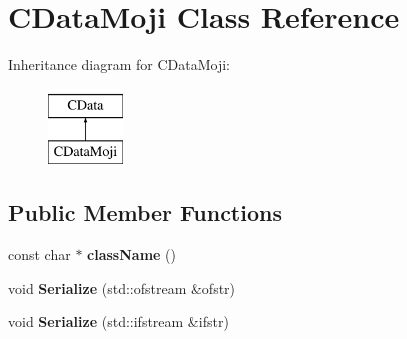 \hypertarget{classCDataMoji}{\section{C\-Data\-Moji Class Reference}
\label{classCDataMoji}
}
Inheritance diagram for C\-Data\-Moji\-:\begin{figure}[H]
\begin{center}
\leavevmode
\includegraphics[height=2.000000cm]{classCDataMoji}
\end{center}
\end{figure}
\subsection*{Public Member Functions}
\begin{DoxyCompactItemize}
\item 
\hypertarget{classCDataMoji_a47bf8c70b639454b5a8c892dc93700fe}{const char $\ast$ {\bfseries class\-Name} ()}\label{classCDataMoji_a47bf8c70b639454b5a8c892dc93700fe}

\item 
\hypertarget{classCDataMoji_a8ac19c7c8cc27f58923eb988aa4c6372}{void {\bfseries Serialize} (std\-::ofstream \&ofstr)}\label{classCDataMoji_a8ac19c7c8cc27f58923eb988aa4c6372}

\item 
\hypertarget{classCDataMoji_a8ca817fab62af63b700748815671bb3b}{void {\bfseries Serialize} (std\-::ifstream \&ifstr)}\label{classCDataMoji_a8ca817fab62af63b700748815671bb3b}

\end{DoxyCompactItemize}
